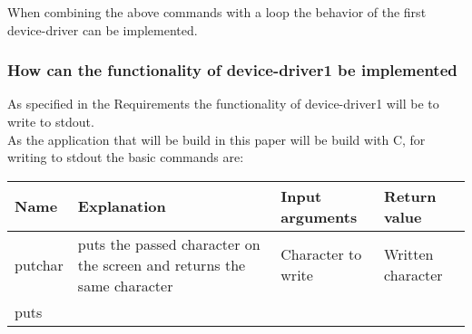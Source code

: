 When combining the above commands with a loop the behavior of the first
device-driver can be implemented.

\hypertarget{how-can-the-functionality-of-device-driver1-be-implemented}{%
\subsubsection{How can the functionality of device-driver1 be
implemented}\label{how-can-the-functionality-of-device-driver1-be-implemented}}

As specified in the Requirements the functionality of device-driver1
will be to write to stdout.\\
As the application that will be build in this paper will be build with
C, for writing to stdout the basic commands are:

\begin{longtable}[]{@{}llll@{}}
\toprule
\begin{minipage}[b]{0.11\columnwidth}\raggedright
Name\strut
\end{minipage} & \begin{minipage}[b]{0.23\columnwidth}\raggedright
Explanation\strut
\end{minipage} & \begin{minipage}[b]{0.30\columnwidth}\raggedright
Input arguments\strut
\end{minipage} & \begin{minipage}[b]{0.25\columnwidth}\raggedright
Return value\strut
\end{minipage}\tabularnewline
\midrule
\endhead
\begin{minipage}[t]{0.11\columnwidth}\raggedright
putchar\strut
\end{minipage} & \begin{minipage}[t]{0.23\columnwidth}\raggedright
puts the passed character on the screen and returns the same
character\strut
\end{minipage} & \begin{minipage}[t]{0.30\columnwidth}\raggedright
Character to write\strut
\end{minipage} & \begin{minipage}[t]{0.25\columnwidth}\raggedright
Written character\strut
\end{minipage}\tabularnewline
\begin{minipage}[t]{0.11\columnwidth}\raggedright
puts\strut
\end{minipage} & \begin{minipage}[t]{0.23\columnwidth}\raggedright

\end{minipage}
\end{longtable}
